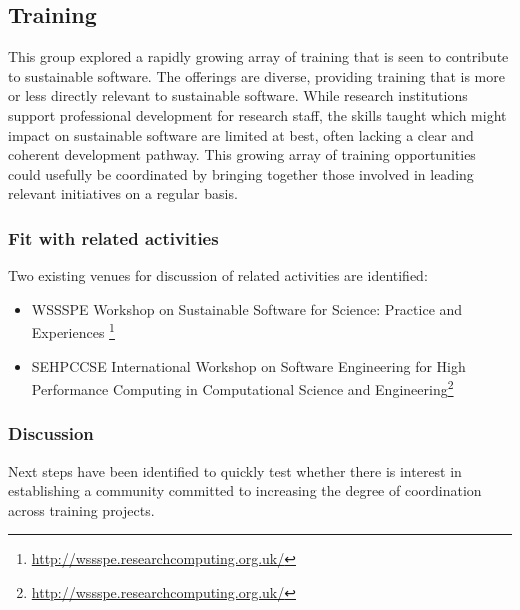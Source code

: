 \subsection{Training}


This group explored a rapidly growing array of training that is seen to contribute to sustainable software. The offerings are diverse, providing training that is more or less directly relevant to sustainable software. While research institutions  support professional development for research staff, the skills taught which might impact on sustainable software are limited at best, often lacking a clear and coherent development pathway. This growing array of training opportunities could usefully be coordinated by bringing together those involved in leading relevant initiatives on a regular basis.

\subsubsection{Fit with related activities}
Two existing venues for discussion of related activities are identified:

\begin{itemize}

\item
WSSSPE Workshop on Sustainable Software for Science: Practice and Experiences \footnote{\url{http://wssspe.researchcomputing.org.uk/}} 

\item
SEHPCCSE International Workshop on Software Engineering for High Performance Computing in Computational Science and Engineering\footnote{\url{http://wssspe.researchcomputing.org.uk/}} 

\end{itemize}

\subsubsection{Discussion}

Next steps have been identified to quickly test whether there is interest in establishing a community committed to increasing the degree of coordination across training projects.

